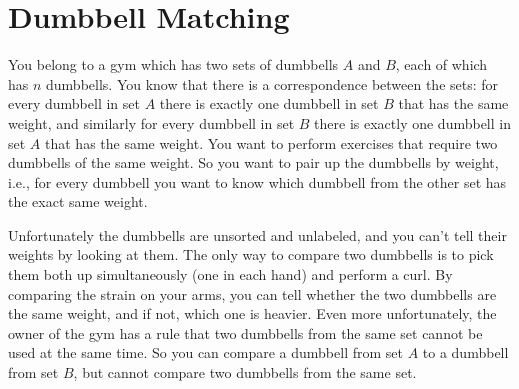 \documentclass{article}
\begin{document}
\section{Dumbbell Matching}
You belong to a gym which has two sets of dumbbells $A$ and $B$, each of which has $n$ dumbbells.  You know that there is a correspondence between the sets: for every dumbbell in set $A$ there is exactly one dumbbell in set $B$ that has the same weight, and similarly for every dumbbell in set $B$ there is exactly one dumbbell in set $A$ that has the same weight.  You want to perform exercises that require two dumbbells of the same weight.  So you want to pair up the dumbbells by weight, i.e., for every dumbbell you want to know which dumbbell from the other set has the exact same weight.

Unfortunately the dumbbells are unsorted and unlabeled, and you can't tell their weights by looking at them. The only way to compare two dumbbells is to pick them both up simultaneously (one in each hand) and perform a curl.  By comparing the strain on your arms, you can tell whether the two dumbbells are the same weight, and if not, which one is heavier.  Even more unfortunately, the owner of the gym has a rule that two dumbbells from the same set cannot be used at the same time.  So you can compare a dumbbell from set $A$ to a dumbbell from set $B$, but cannot compare two dumbbells from the same set.  
\end{document}
